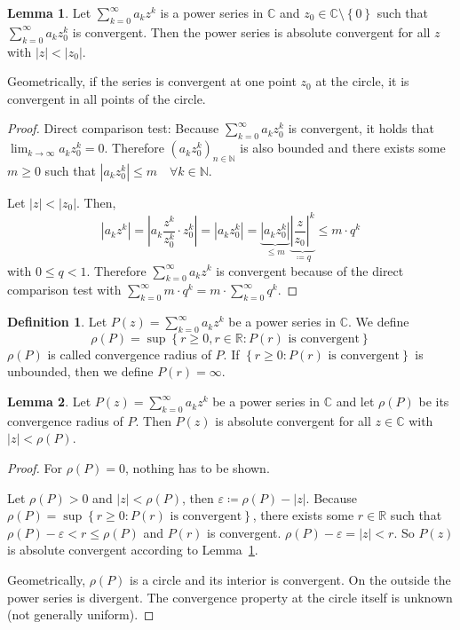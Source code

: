 \documentclass[a4paper,landscape,twocolumn]{article}
\theoremstyle{definition}
\newtheorem{defi}{Definition}
\newtheorem{lemma}{Lemma}
\newcommand\set[1]{\left\{#1\right\}}
\newcommand\abs[1]{\left|#1\right|}
\begin{document}
\begin{lemma}
  \label{series-absolute-conv}
  Let $\sum_{k=0}^\infty a_k z^k$ is a power series in $\mathbb C$ and $z_0 \in \mathbb C \setminus \set{0}$
  such that $\sum_{k=0}^\infty a_k z_0^k$ is convergent. Then the power series is
  absolute convergent for all $z$ with $\abs{z} < \abs{z_0}$.

  Geometrically, if the series is convergent at one point $z_0$ at the circle,
  it is convergent in all points of the circle.
\end{lemma}
\begin{proof}
  Direct comparison test: Because $\sum_{k=0}^\infty a_k z_0^k$ is convergent,
  it holds that $\lim_{k\to\infty} a_k z_0^k = 0$.
  Therefore $(a_k z_0^k)_{n\in\mathbb N}$ is also bounded and there exists some
  $m \geq 0$ such that $\abs{a_k z_0^k} \leq m \quad \forall k \in \mathbb N$.

  Let $\abs{z} < \abs{z_0}$. Then,
  \[
    \abs{a_k z^k}
    = \abs{a_k \frac{z^k}{z_0^k} \cdot z_0^k}
    = \abs{a_k z_0^k}
    = \underbrace{\abs{a_k z_0^k}}_{\leq m} \underbrace{\abs{\frac{z}{z_0}}^k}_{\coloneqq q}
    \leq m \cdot q^k
  \]
  with $0 \leq q < 1$. Therefore $\sum_{k=0}^\infty a_k z^k$ is convergent
  because of the direct comparison test with $\sum_{k=0}^\infty m \cdot q^k = m \cdot \sum_{k=0}^\infty q^k$.
\end{proof}
\begin{defi}
  Let $P(z) = \sum_{k=0}^\infty a_k z^k$ be a power series in $\mathbb C$. We define
  \[ \rho(P) = \sup\set{r \geq 0, r \in \mathbb R: P(r) \text{ is convergent}} \]
  $\rho(P)$ is called convergence radius of $P$. If $\set{r \geq 0: P(r) \text{ is convergent}}$
  is unbounded, then we define $P(r) = \infty$.
\end{defi}

\begin{lemma}
  Let $P(z) = \sum_{k=0}^\infty a_k z^k$ be a power series in $\mathbb C$ and
  let $\rho(P)$ be its convergence radius of $P$. Then $P(z)$ is absolute convergent
  for all $z \in \mathbb C$ with $\abs{z} < \rho(P)$.
\end{lemma}
\begin{proof}
  For $\rho(P) = 0$, nothing has to be shown.

  Let $\rho(P) > 0$ and $\abs{z} < \rho(P)$, then $\varepsilon \coloneqq \rho(P) - \abs{z}$.
  Because $\rho(P) = \sup\set{r \geq 0: P(r) \text{ is convergent}}$, there exists some
  $r \in \mathbb R$ such that $\rho(P) - \varepsilon < r \leq \rho(P)$ and $P(r)$ is convergent.
  $\rho(P) - \varepsilon = \abs{z} < r$. So $P(z)$ is absolute convergent
  according to Lemma~\ref{series-absolute-conv}.

  Geometrically, $\rho(P)$ is a circle and its interior is convergent.
  On the outside the power series is divergent. The convergence property
  at the circle itself is unknown (not generally uniform).
\end{proof}
\end{document}
